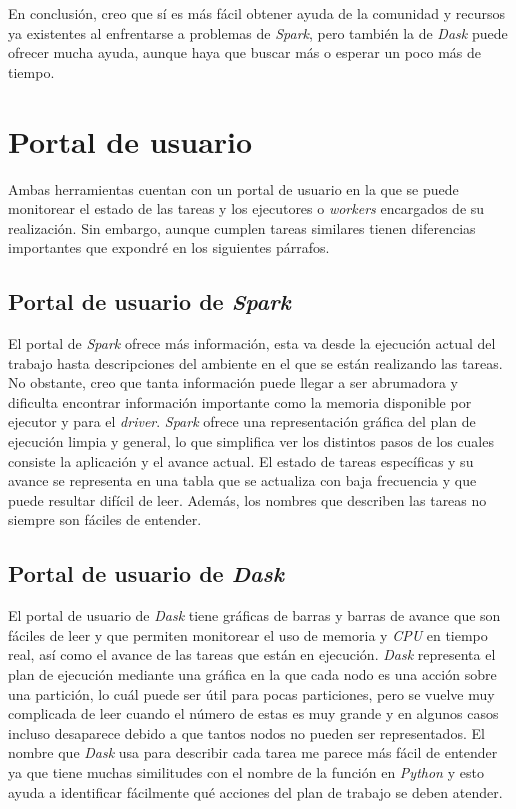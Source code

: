 En conclusión, creo que sí es más fácil obtener ayuda de la comunidad y recursos ya existentes al enfrentarse a problemas de \textit{Spark}, pero también la de \textit{Dask} puede ofrecer mucha ayuda, aunque haya que buscar más o esperar un poco más de tiempo.

\section{Portal de usuario}

Ambas herramientas cuentan con un portal de usuario en la que se puede monitorear el estado de las tareas y los ejecutores o \textit{workers} encargados de su realización. Sin embargo, aunque cumplen tareas similares tienen diferencias importantes que expondré en los siguientes párrafos.

\subsection{Portal de usuario de \textit{Spark}}

El portal de \textit{Spark} ofrece más información, esta va desde la ejecución actual del trabajo hasta descripciones del ambiente en el que se están realizando las tareas. No obstante, creo que tanta información puede llegar a ser abrumadora y dificulta encontrar información importante como la memoria disponible por ejecutor y para el \textit{driver}. \textit{Spark} ofrece una representación gráfica del plan de ejecución limpia y general, lo que simplifica ver los distintos pasos de los cuales consiste la aplicación y el avance actual. El estado de tareas específicas y su avance se representa en una tabla que se actualiza con baja frecuencia y que puede resultar difícil de leer. Además, los nombres que describen las tareas no siempre son fáciles de entender.

\subsection{Portal de usuario de \textit{Dask}}

El portal de usuario de \textit{Dask} tiene gráficas de barras y barras de avance que son fáciles de leer y que permiten monitorear el uso de memoria y \textit{CPU} en tiempo real, así como el avance de las tareas que están en ejecución. \textit{Dask} representa el plan de ejecución mediante una gráfica en la que cada nodo es una acción sobre una partición, lo cuál puede ser útil para pocas particiones, pero se vuelve muy complicada de leer cuando el número de estas es muy grande y en algunos casos incluso desaparece debido a que tantos nodos no pueden ser representados. El nombre que \textit{Dask} usa para describir cada tarea me parece más fácil de entender ya que tiene muchas similitudes con el nombre de la función en \textit{Python} y esto ayuda a identificar fácilmente qué acciones del plan de trabajo se deben atender.

